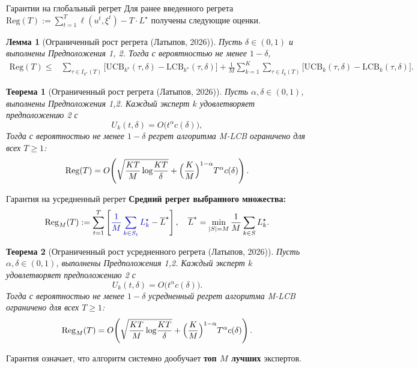 \documentclass[aspectratio=169]{beamer}
\newtheorem{ru_lemma}{Лемма}
\newtheorem{ru_theorem}{Теорема}
\begin{document}
\begin{frame}{Гарантии на глобальный регрет}
\footnotesize
Для ранее введенного регрета
$\mathrm{Reg}(T):=\sum_{t=1}^T\ell(u^t,\xi^t)-T\cdot L^\star$
получены следующие оценки.

\begin{ru_lemma}[Ограниченный рост регрета (Латыпов, 2026)]
Пусть $\delta \in (0,1)$ и выполнены Предположения 1, 2. Тогда с вероятностью не менее $1-\delta$,
\begin{align*}
\mathrm{Reg}(T) \le&
\sum_{\tau \in I_{k^\star}(T)}
\bigl[\mathrm{UCB}_{k^\star}(\tau,\delta)-\mathrm{LCB}_{k^\star}(\tau,\delta)\bigr]
+ \frac{1}{M}\sum_{k=1}^K \sum_{\tau \in I_k(T)}
\bigl[\mathrm{UCB}_k(\tau,\delta)-\mathrm{LCB}_k(\tau,\delta)\bigr].
\end{align*}
\end{ru_lemma}

\begin{ru_theorem}[Ограниченный рост регрета (Латыпов, 2026)]
Пусть $\alpha,\delta\in(0,1)$, выполнены Предположения 1,2. Каждый эксперт $k$ удовлетворяет предположению 2 с
$$
U_k(t,\delta)=O\big(t^\alpha c(\delta)\big),
$$
\vspace{-0.3cm}
Тогда с вероятностью не менее $1-\delta$ регрет алгоритма M-LCB ограничено для всех $T\ge1$:
\[
\mathrm{Reg}(T)=O\!\left(\sqrt{\frac{KT}{M}\log\!\frac{KT}{\delta}}+\Bigl(\frac{K}{M}\Bigr)^{1-\alpha}T^{\alpha}c(\delta)\right).
\]
\end{ru_theorem}
\end{frame}

\begin{frame}{Гарантия на усредненный регрет}
\small
\textbf{Средний регрет выбранного множества:}
\[
\mathrm{Reg}_M(T):=\sum_{t=1}^T\left[{\color{blue!75!black}\frac{1}{M}\sum_{k\in S_t}L_k^\star}-\overline{L}^\star\right],
\quad
\overline{L}^\star=\min_{|S|=M}\frac{1}{M}\sum_{k\in S}L_k^\star.
\]

\begin{ru_theorem}[Ограниченный рост усредненного регрета (Латыпов, 2026)]
Пусть $\alpha,\delta\in(0,1)$, выполнены Предположения 1,2. Каждый эксперт $k$ удовлетворяет предположению 2 с
\vspace{-0.1cm}
$$
U_k(t,\delta)=O\big(t^\alpha c(\delta)\big).
$$
\vspace{-0.05cm}
Тогда с вероятностью не менее $1-\delta$ усредненный регрет алгоритма M-LCB ограничено для всех $T\ge1$:
\[
\mathrm{Reg}_M(T)=O\!\left(\sqrt{\frac{KT}{M}\log\!\frac{KT}{\delta}}+\Bigl(\frac{K}{M}\Bigr)^{1-\alpha}T^{\alpha}c(\delta)\right).
\]
\end{ru_theorem}

Гарантия означает, что алгоритм системно дообучает \textbf{топ $M$ лучших} экспертов.
\end{frame}
\end{document}
